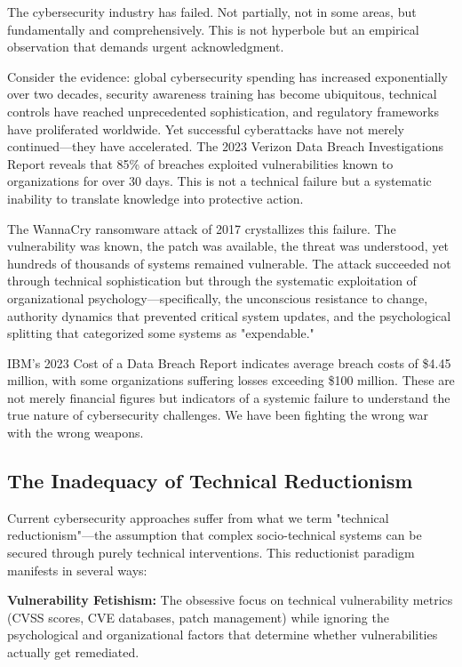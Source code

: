 \documentclass[10pt, twocolumn]{article}
\begin{document}
The cybersecurity industry has failed. Not partially, not in some areas, but fundamentally and comprehensively. This is not hyperbole but an empirical observation that demands urgent acknowledgment.

Consider the evidence: global cybersecurity spending has increased exponentially over two decades, security awareness training has become ubiquitous, technical controls have reached unprecedented sophistication, and regulatory frameworks have proliferated worldwide. Yet successful cyberattacks have not merely continued—they have accelerated. The 2023 Verizon Data Breach Investigations Report reveals that 85\% of breaches exploited vulnerabilities known to organizations for over 30 days\cite{verizon2023}. This is not a technical failure but a systematic inability to translate knowledge into protective action.

The WannaCry ransomware attack of 2017 crystallizes this failure. The vulnerability was known, the patch was available, the threat was understood, yet hundreds of thousands of systems remained vulnerable. The attack succeeded not through technical sophistication but through the systematic exploitation of organizational psychology—specifically, the unconscious resistance to change, authority dynamics that prevented critical system updates, and the psychological splitting that categorized some systems as "expendable."

IBM's 2023 Cost of a Data Breach Report indicates average breach costs of \$4.45 million\cite{ibm2023}, with some organizations suffering losses exceeding \$100 million. These are not merely financial figures but indicators of a systemic failure to understand the true nature of cybersecurity challenges. We have been fighting the wrong war with the wrong weapons.

\subsection{The Inadequacy of Technical Reductionism}

Current cybersecurity approaches suffer from what we term "technical reductionism"—the assumption that complex socio-technical systems can be secured through purely technical interventions. This reductionist paradigm manifests in several ways:

\textbf{Vulnerability Fetishism:} The obsessive focus on technical vulnerability metrics (CVSS scores, CVE databases, patch management) while ignoring the psychological and organizational factors that determine whether vulnerabilities actually get remediated.
\end{document}
